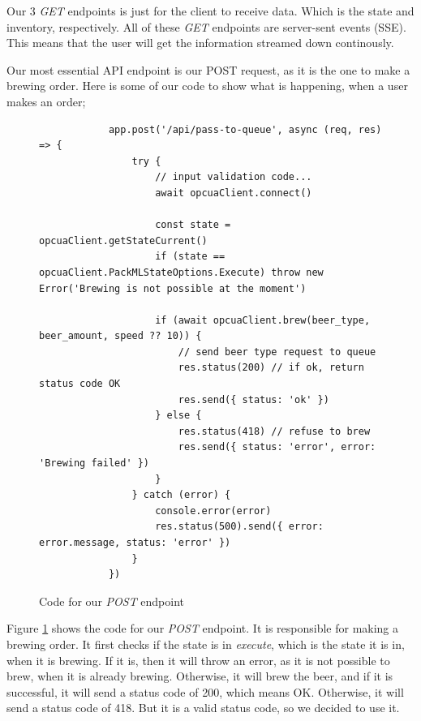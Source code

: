Our 3 \textit{GET} endpoints is just for the client to receive data. Which is the state and inventory, respectively.
All of these \textit{GET} endpoints are server-sent events (SSE). This means that the user will get the information streamed down continously. \newline

Our most essential API endpoint is our POST request, as it is the one to make a brewing order. Here is some of our code to show what is happening, when a user makes an order;

\begin{center}
    \centering
    \begin{figure}[H]
        \begin{verbatim}
            app.post('/api/pass-to-queue', async (req, res) => {
                try {
                    // input validation code...
                    await opcuaClient.connect()
        
                    const state = opcuaClient.getStateCurrent()
                    if (state == opcuaClient.PackMLStateOptions.Execute) throw new Error('Brewing is not possible at the moment')
        
                    if (await opcuaClient.brew(beer_type, beer_amount, speed ?? 10)) {
                        // send beer type request to queue
                        res.status(200) // if ok, return status code OK
                        res.send({ status: 'ok' })
                    } else {
                        res.status(418) // refuse to brew
                        res.send({ status: 'error', error: 'Brewing failed' })
                    }
                } catch (error) {
                    console.error(error)
                    res.status(500).send({ error: error.message, status: 'error' })
                }
            })
        \end{verbatim}
        \caption{Code for our \textit{POST} endpoint}
        \label{fig:pass_to_queue_api}
    \end{figure}
\end{center}
Figure \ref{fig:pass_to_queue_api} shows the code for our \textit{POST} endpoint. 
It is responsible for making a brewing order. It first checks if the state is in \textit{execute}, 
which is the state it is in, when it is brewing. If it is, then it will throw an error, 
as it is not possible to brew, when it is already brewing. Otherwise, it will brew the beer, 
and if it is successful, it will send a status code of 200, which means OK. Otherwise, 
it will send a status code of 418.
But it is a valid status code, so we decided to use it.

